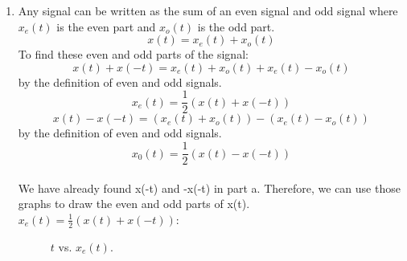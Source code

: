 \documentclass[10pt,a4paper, margin=1in]{article}
\begin{document}
\begin{enumerate}
\begin{enumerate}
 \begin{filecontents}{fig9.dat}
  n   xn
 -5 0
 -4 0
 -3 0
 -2 2
 -1 2
 0 0
 1 0
 \end{filecontents}
    Since the graphs of x(t) and -x(-t) are different, we can directly say that x(t) is not equal to -x(-t). Hence, x(t) is not odd as it does not satisfy the condition. \\
    
    Therefore, we can say that x(t) is neither even nor odd. \\
    
    
    \item %
    Any signal can be written as the sum of an even signal and odd signal where $x_e(t)$ is the even part and $x_o(t)$ is the odd part. 
    \[x(t)=x_e(t)+x_o(t)\]
    To find these even and odd parts of the signal:
     \[x(t)+x(-t)=x_e(t)+x_o(t)+x_e(t)-x_o(t)\]  by the definition of even and odd signals.
      \[x_e(t)=\frac{1}2(x(t)+x(-t))\]
    \[x(t)-x(-t)=(x_e(t)+x_o(t))-(x_e(t)-x_o(t))\]  by the definition of even and odd signals.
    \[x_0(t)=\frac{1}2(x(t)-x(-t))\]\\
    We have already found x(-t) and -x(-t) in part a. Therefore, we can use those graphs to draw the even and odd parts of x(t).\\
    
    $x_e(t)=\frac{1}2(x(t)+x(-t))$:
    \begin{figure}[H]
     \centering
         \caption{$t$ vs. $x_e(t)$.}
         \label{fig:fig10}
     \end{figure}
     

\end{enumerate}
\end{enumerate}
\end{document}

